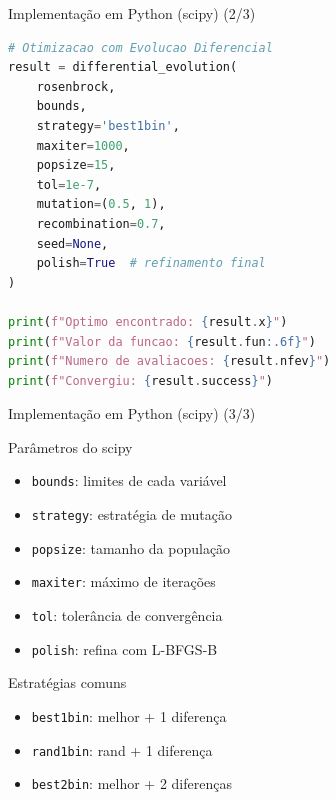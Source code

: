 \begin{frame}[fragile]{Implementação em Python (scipy) (2/3)}
\begin{lstlisting}[language=Python, caption=Evolução Diferencial (Otimização), basicstyle=\ttfamily\scriptsize]
# Otimizacao com Evolucao Diferencial
result = differential_evolution(
    rosenbrock,
    bounds,
    strategy='best1bin',
    maxiter=1000,
    popsize=15,
    tol=1e-7,
    mutation=(0.5, 1),
    recombination=0.7,
    seed=None,
    polish=True  # refinamento final
)

print(f"Optimo encontrado: {result.x}")
print(f"Valor da funcao: {result.fun:.6f}")
print(f"Numero de avaliacoes: {result.nfev}")
print(f"Convergiu: {result.success}")
\end{lstlisting}
\end{frame}

\begin{frame}{Implementação em Python (scipy) (3/3)}
\begin{block}{Parâmetros do scipy}
\begin{itemize}
    \item \texttt{bounds}: limites de cada variável
    \item \texttt{strategy}: estratégia de mutação
    \item \texttt{popsize}: tamanho da população
    \item \texttt{maxiter}: máximo de iterações
    \item \texttt{tol}: tolerância de convergência
    \item \texttt{polish}: refina com L-BFGS-B
\end{itemize}
\end{block}

\vspace{0.3cm}
\begin{block}{Estratégias comuns}
\begin{itemize}
    \item \texttt{best1bin}: melhor + 1 diferença
    \item \texttt{rand1bin}: rand + 1 diferença
    \item \texttt{best2bin}: melhor + 2 diferenças
\end{itemize}
\end{block}
\end{frame}

